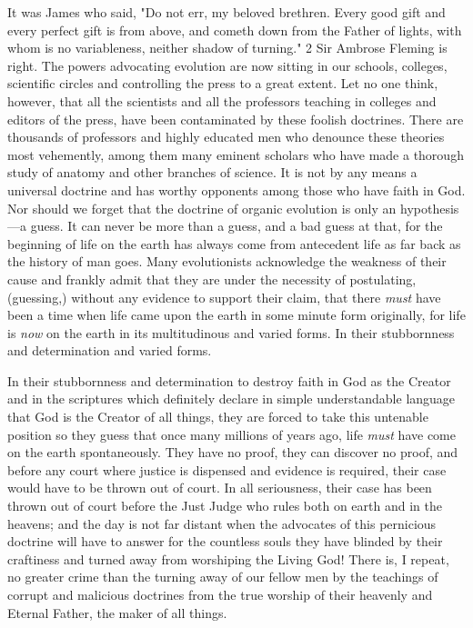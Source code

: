 It was James who said, "Do not err, my beloved brethren. Every good gift and every perfect
gift is from above, and cometh down from the Father of lights, with whom is no variableness,
neither shadow of turning." 2 Sir Ambrose Fleming is right. The powers advocating
evolution are now sitting in our schools, colleges, scientific circles and controlling the press
to a great extent. Let no one think, however, that all the scientists and all the professors
teaching in colleges and editors of the press, have been contaminated by these foolish
doctrines. There are thousands of professors and highly educated men who denounce these
theories most vehemently, among them many eminent scholars who have made a thorough
study of anatomy and other branches of science. It is not by any means a universal doctrine
and has worthy opponents among those who have faith in God. Nor should we forget that the
doctrine of organic evolution is only an hypothesis—a guess. It can never be more than a
guess, and a bad guess at that, for the beginning of life on the earth has always come from
antecedent life as far back as the history of man goes. Many evolutionists acknowledge the
weakness of their cause and frankly admit that they are under the necessity of postulating,
(guessing,) without any evidence to support their claim, that there \textit{must} have been a time
when life came upon the earth in some minute form originally, for life is \textit{now} on the earth in
its multitudinous and varied forms. In their stubbornness and determination and varied forms.

In their stubbornness and determination to destroy faith in God as the Creator and in the
scriptures which definitely declare in simple understandable language that God is the Creator
of all things, they are forced to take this untenable position so they guess that once many
millions of years ago, life \textit{must} have come on the earth spontaneously. They have no proof,
they can discover no proof, and before any court where justice is dispensed and evidence is
required, their case would have to be thrown out of court. In all seriousness, their case has
been thrown out of court before the Just Judge who rules both on earth and in the heavens;
and the day is not far distant when the advocates of this pernicious doctrine will have to
answer for the countless souls they have blinded by their craftiness and turned away from
worshiping the Living God! There is, I repeat, no greater crime than the turning away of our
fellow men by the teachings of corrupt and malicious doctrines from the true worship of their
heavenly and Eternal Father, the maker of all things.

